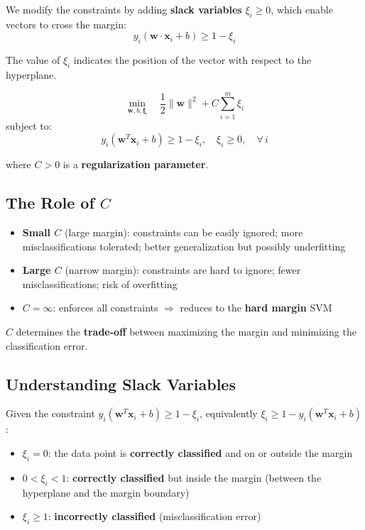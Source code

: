 \documentclass[11pt,a4paper]{article}
\theoremstyle{definition}
\theoremstyle{plain}
\theoremstyle{remark}
\begin{document}
We modify the constraints by adding \textbf{slack variables} $\xi_i \geq 0$, which enable vectors to cross the margin:
\[
y_i(\mathbf{w} \cdot \mathbf{x}_i + b) \geq 1 - \xi_i
\]

The value of $\xi_i$ indicates the position of the vector with respect to the hyperplane.

\begin{tcolorbox}[colback=purple!5!white,colframe=purple!75!black,title=\textbf{Soft Margin SVM Formulation}]
\[
\min_{\mathbf{w}, b, \boldsymbol{\xi}} \quad \frac{1}{2} \|\mathbf{w}\|^2 + C \sum_{i=1}^{m} \xi_i
\]
subject to:
\[
y_i(\mathbf{w}^T \mathbf{x}_i + b) \geq 1 - \xi_i, \quad \xi_i \geq 0, \quad \forall \, i
\]

where $C > 0$ is a \textbf{regularization parameter}.
\end{tcolorbox}

\subsection{The Role of $C$}

\begin{itemize}
    \item \textbf{Small $C$} (large margin): constraints can be easily ignored; more misclassifications tolerated; better generalization but possibly underfitting
    \item \textbf{Large $C$} (narrow margin): constraints are hard to ignore; fewer misclassifications; risk of overfitting
    \item $C = \infty$: enforces all constraints $\Rightarrow$ reduces to the \textbf{hard margin} SVM
\end{itemize}

$C$ determines the \textbf{trade-off} between maximizing the margin and minimizing the classification error.

\subsection{Understanding Slack Variables}

Given the constraint $y_i(\mathbf{w}^T \mathbf{x}_i + b) \geq 1 - \xi_i$, equivalently $\xi_i \geq 1 - y_i(\mathbf{w}^T \mathbf{x}_i + b)$:

\begin{tcolorbox}[colback=yellow!10!white,colframe=orange!75!black,title=\textbf{Interpretation of Slack Variable Values}]
\begin{itemize}
    \item $\xi_i = 0$: the data point is \textbf{correctly classified} and on or outside the margin
    \item $0 < \xi_i < 1$: \textbf{correctly classified} but inside the margin (between the hyperplane and the margin boundary)
    \item $\xi_i \geq 1$: \textbf{incorrectly classified} (misclassification error)
\end{itemize}
\end{tcolorbox}
\end{document}
